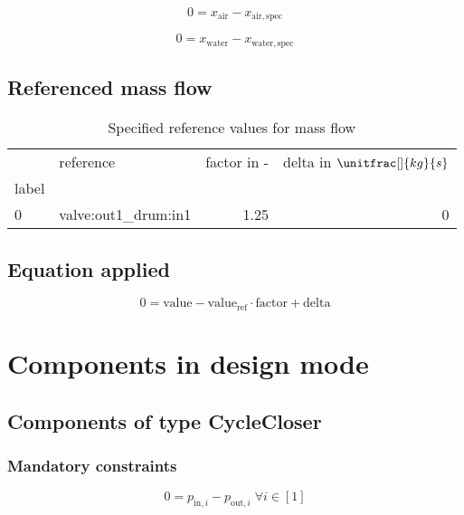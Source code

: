 \begin{equation}
\label{eq:Connection_air}
0 = x_\mathrm{air} - x_\mathrm{air,spec}
\end{equation}

\begin{equation}
\label{eq:Connection_water}
0 = x_\mathrm{water} - x_\mathrm{water,spec}
\end{equation}

\subsection{Referenced mass flow}

\begin{table}[H]
\centering
\caption{Specified reference values for mass flow}
\begin{tabular}{llrr}
\toprule
{} &             reference &  factor in - &  delta in $\unitfrac[]{kg}{s}$ \\
label &                       &              &                                \\
\midrule
0     &  valve:out1\_drum:in1 &         1.25 &                              0 \\
\bottomrule
\end{tabular}
\end{table}
\subsection{Equation applied}

\begin{equation}
\label{eq:Connection_ref}
0 = \text{value} - \text{value}_\mathrm{ref} \cdot \mathrm{factor} + \text{delta}
\end{equation}

\section{Components in design mode}

\subsection{Components of type CycleCloser}

\subsubsection{Mandatory constraints}

\begin{equation}
\label{eq:CycleCloser_pressure_equality_constraints}
0=p_{\mathrm{in,}i}-p_{\mathrm{out,}i}\; \forall i \in [1]
\end{equation}

